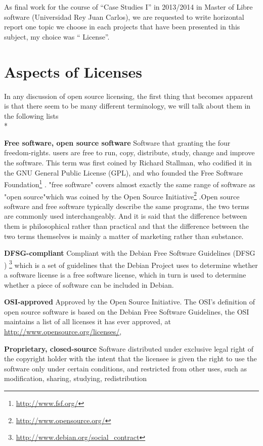\documentclass[11pt]{article} %
\begin{document}

\par As final work for the course of “Case Studies I” in 2013/2014 in Master of Libre software (Universidad Rey Juan Carlos), we are requested to write horizontal  report one topic we choose in each projects that have been presented in this subject,  my choice was “ License”.  
\section{Aspects of Licenses}

In any discussion of open source licensing, the first thing that becomes apparent is that there seem to be many different terminology, we will talk about them in the following lists
\\*

{\bf Free software, open source software} 
Software that granting the four freedom-rights. users are free to run, copy, distribute, study, change and improve the software.
This term was first coined by Richard Stallman, who codified it in the GNU General Public License (GPL), and who founded the Free Software Foundation\footnote{\url { http://www.fsf.org/}} . "free software" covers almost exactly the same range of software as "open source"which was coined by the Open Source Initiative\footnote{\url{http://www.opensource.org/}} .Open source software and free software typically describe the same programs, the two terms are commonly used interchangeably. And it is said that the difference between them is philosophical rather than practical and that the difference between the two terms themselves is mainly a matter of marketing rather than substance.

{\bf DFSG-compliant} 
Compliant with the Debian Free Software Guidelines (DFSG )  \footnote{\url{http://www.debian.org/social_contract}}
which is a set of guidelines that the Debian Project uses to determine whether a software license is a free software license, which in turn is used to determine whether a piece of software can be included in Debian.
  
{\bf OSI-approved} 
Approved by the Open Source Initiative. The OSI's definition of open source software is based on the Debian Free Software Guidelines,  the OSI maintains a list of all licenses it has ever approved, at \url {http://www.opensource.org/licenses/}, 

{ \bf Proprietary, closed-source}
Software distributed under exclusive legal right of the copyright holder with the intent that the licensee is given the right to use the software only under certain conditions, and restricted from other uses, such as modification, sharing, studying, redistribution
\end{document}

